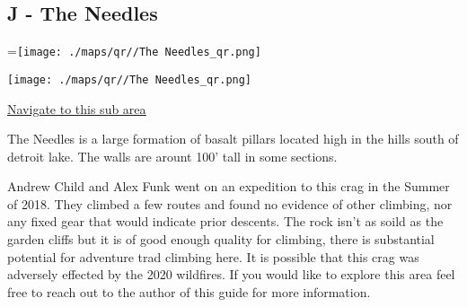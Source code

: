 	\begin{multicols}{2}

\section{J - The Needles}\label{sa:The Needles}
=\hbox{\texttt{[image: ./maps/qr//The Needles\_qr.png]}}%
\begin{center}
\texttt{[image: ./maps/qr//The Needles\_qr.png]}
\end{center}
\begin{center}
\underline{\textcolor{blue}{\href{http://maps.google.com/maps?q=44.59672447306725,-122.15597149494864}{Navigate to this sub area}}}
\end{center}


The Needles is a large formation of basalt pillars located high in the hills south of detroit lake. The walls are arount 100' tall in some sections.

Andrew Child and Alex Funk went on an expedition to this crag in the Summer of 2018. They climbed a few routes and found no evidence of other climbing, nor any fixed gear that would indicate prior descents. The rock isn't as soild as the garden cliffs but it is of good enough quality for climbing, there is substantial potential for adventure trad climbing here. It is possible that this crag was adversely effected by the 2020 wildfires. If you would like to explore this area feel free to reach out to the author of this guide for more information.\\





\end{multicols}
\clearpage